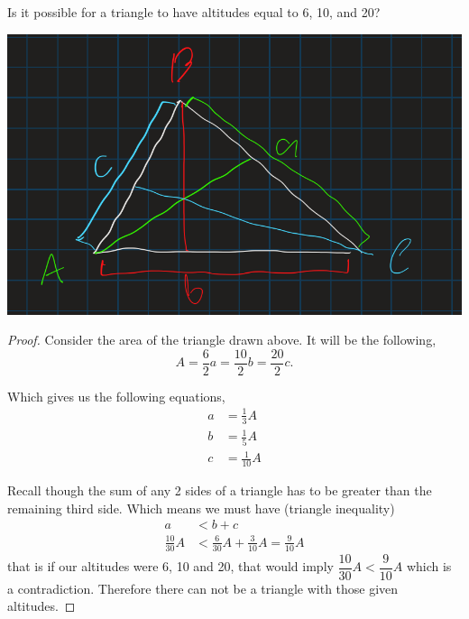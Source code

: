 \documentclass[11pt]{article}
\newenvironment{problem}[2][Problem\!]{\begin{trivlist}
\item[\hskip \labelsep {\bfseries #1}\hskip \labelsep {\bfseries #2}]}{\end{trivlist}}
\begin{document}
\begin{tcolorbox}
    \begin{problem} {IC | 11/15 | 151.}
        Is it possible for a triangle to have altitudes equal to 6, 10, and 20?
    \end{problem}
\end{tcolorbox}
\includegraphics[scale=.5]{prob2}
\begin{proof}
    Consider the area of the triangle drawn above. It will be the following,
    \[A = \frac{6}{2}a = \frac{10}{2}b = \frac{20}{2}c.\]

    Which gives us the following equations,
    \begin{align*}
        a &= \frac{1}{3}A \\
        b &= \frac{1}{5}A \\
        c &= \frac{1}{10}A
    \end{align*}

    Recall though the sum of any 2 sides of a triangle has to be greater than the remaining third side. Which means we must have (triangle inequality)
    \begin{align*}
        a &< b + c \\
        \frac{10}{30}A &< \frac{6}{30}A + \frac{3}{10}A = \frac{9}{10}A
    \end{align*}
    that is if our altitudes were 6, 10 and 20, that would imply $\dfrac{10}{30}A < \dfrac{9}{10}A$ which is a contradiction. Therefore there can not be a triangle with those given altitudes. 
\end{proof}
\end{document}
